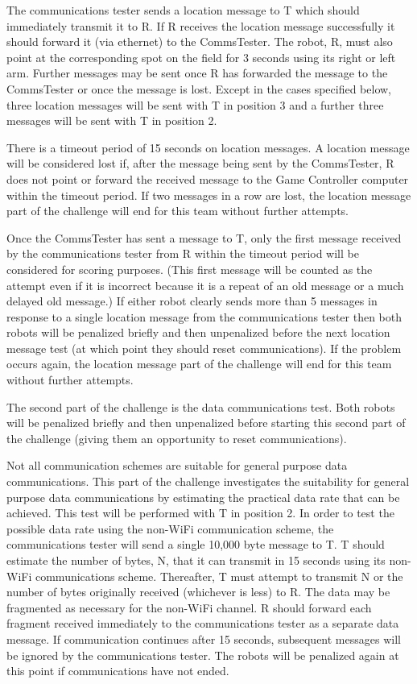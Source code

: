 \documentclass[12pt]{article}
\begin{document}
The communications tester sends a location message to T which should immediately transmit it to R.
If R receives the location message successfully it should forward it (via ethernet) to the CommsTester. The robot, R, must also point at the corresponding spot on the field for 3 seconds using its right or left arm. Further messages may be sent once R has forwarded the message to the CommsTester or once the message is lost. Except in the cases specified below, three location messages will be sent with T in position 3 and a further three messages will be sent with T in position 2.

There is a timeout period of 15 seconds on location messages. A location message will be considered lost if, after the message being sent by the CommsTester, R does not point or forward the received message to the Game Controller computer within the timeout period. If two messages in a row are lost, the location message part of the challenge will end for this team without further attempts.

Once the CommsTester has sent a message to T, only the first message received by the communications tester from R within the timeout period will be considered for scoring purposes. (This first message will be counted as the attempt even if it is incorrect because it is a repeat of an old message or a much delayed old message.) If either robot clearly sends more than 5 messages in response to a single location message from the communications tester then both robots will be penalized briefly and then unpenalized before the next location message test (at which point they should reset communications). If the problem occurs again, the location message part of the challenge will end for this team without further attempts.

The second part of the challenge is the data communications test. Both robots will be penalized briefly and then unpenalized before starting this second part of the challenge (giving them an opportunity to reset communications).

Not all communication schemes are suitable for general purpose data communications. This part of the challenge investigates the suitability for general purpose data communications by estimating the practical data rate that can be achieved. This test will be performed with T in position 2.
In order to test the possible data rate using the non-WiFi communication scheme, the communications tester will send a single 10,000 byte message to T. T should estimate the number of bytes, N, that it can transmit in 15 seconds using its non-WiFi communications scheme. Thereafter, T must attempt to transmit N or the number of bytes originally received (whichever is less) to R. The data may be fragmented as necessary for the non-WiFi channel. R should forward each fragment received immediately to the communications tester as a separate data message. If communication continues after 15 seconds, subsequent messages will be ignored by the communications tester. The robots will be penalized again at this point if communications have not ended.
\end{document}
